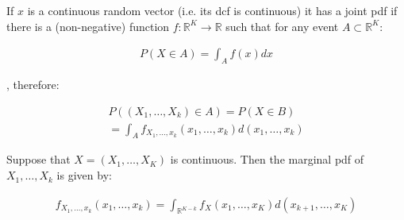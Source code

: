 \documentclass[10pt]{article}
\begin{document}
If $x$ is a continuous random vector (i.e. its dcf is continuous) it has a joint pdf if there
is a (non-negative) function $f : \mathbb{R}^K \to \mathbb{R}$ such that for any event $A \subset \mathbb{R}^K$:

\begin{align*}
    P(X \in A) = \int_A f(x)dx
\end{align*}

, therefore: 

\begin{align*}
    P((X_1, …, X_k) \in A) = P(X \in B) \\ 
    = \int_A f_{X_1, …, x_k}(x_1, …, x_k)d(x_1, …, x_k)
\end{align*}

Suppose that $X = (X_1, …, X_K)$ is continuous. Then the marginal pdf of $X_1, …, X_k$ is given by:

\begin{align*}
    f_{X_1, …, x_k}(x_1, …, x_k) = \int_{\mathbb{R}^{K - k}}f_X(x_1, …, x_K)d(x_{k + 1}, …, x_K)
\end{align*}
\end{document}
